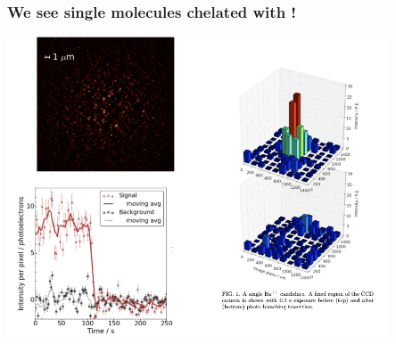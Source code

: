\begin{frame}
\frametitle{We see single molecules chelated with \Bapp!}
  \begin{center}
      \includegraphics[width=0.85\textwidth]{moriond/smfi-observed.png}   
  \end{center}
\end{frame}



